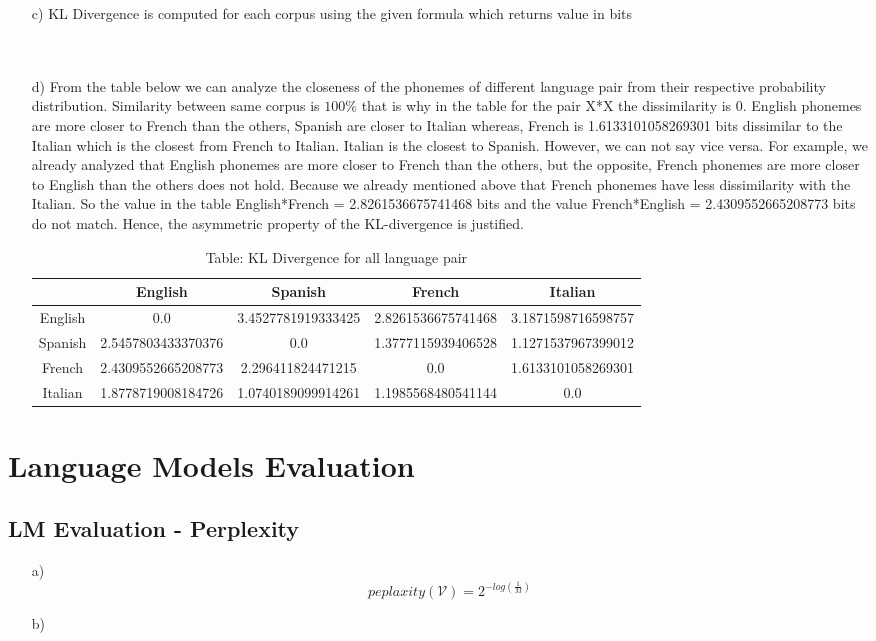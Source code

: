 \documentclass{article}
\begin{document}
\begin{itemize}
    \item[c)]
    KL Divergence is computed for each corpus using the given formula which returns value in bits 
    \\\\\\
    \item[d)]  
        From the table below we can analyze the closeness of the phonemes of different language pair from their respective probability distribution. Similarity between same corpus is $100\%$ that is why in the table for the pair X*X the dissimilarity is 0. English phonemes are more closer to French than the others, Spanish are closer to Italian whereas, French is 1.6133101058269301 bits dissimilar to the Italian which is the closest from French to Italian. Italian is the closest to Spanish. However, we can not say vice versa. For example, we already analyzed that English phonemes are more closer to French than the others, but the opposite, French phonemes are more closer to English than the others does not hold. Because we already mentioned above that French phonemes have less dissimilarity with the Italian. So the value in the table English*French = 2.8261536675741468 bits and the value French*English = 2.4309552665208773 bits do not match. Hence, the asymmetric property of the KL-divergence is justified.
        \begin{table}[ht]
            \centering
            \begin{tabular}{|c| c| c| c| c|}
                \hline 
                & English & Spanish & French & Italian \\ [0.5ex]
                \hline
                English & 0.0 & 3.4527781919333425 & 2.8261536675741468 & 3.1871598716598757\\
                \hline
                Spanish & 2.5457803433370376 & 0.0 & 1.3777115939406528 & 1.1271537967399012 \\
                \hline
                French & 2.4309552665208773 & 2.296411824471215 & 0.0 & 1.6133101058269301 \\
                \hline
                Italian & 1.8778719008184726 & 1.0740189099914261 & 1.1985568480541144 & 0.0   \\ [1ex]
                \hline
            \end{tabular}
            \caption{\hspace*{4.0cm}Table: KL Divergence for all language pair}
        \end{table}
        \end{itemize}


\section{Language Models Evaluation}
\subsection{LM Evaluation - Perplexity}
\begin{itemize}
	\item[a)]
		$$peplaxity(\mathcal{V}) = 2^{-log(\frac{1}{M})}$$
	\item[b)]
		
\end{itemize}
\end{document}
